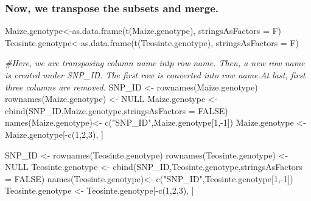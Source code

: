 \documentclass[
]{article}
\newenvironment{Shaded}{\begin{snugshade}}{\end{snugshade}}
\newcommand{\AttributeTok}[1]{\textcolor[rgb]{0.77,0.63,0.00}{#1}}
\newcommand{\CommentTok}[1]{\textcolor[rgb]{0.56,0.35,0.01}{\textit{#1}}}
\newcommand{\ConstantTok}[1]{\textcolor[rgb]{0.00,0.00,0.00}{#1}}
\newcommand{\DecValTok}[1]{\textcolor[rgb]{0.00,0.00,0.81}{#1}}
\newcommand{\FunctionTok}[1]{\textcolor[rgb]{0.00,0.00,0.00}{#1}}
\newcommand{\NormalTok}[1]{#1}
\newcommand{\OtherTok}[1]{\textcolor[rgb]{0.56,0.35,0.01}{#1}}
\newcommand{\SpecialCharTok}[1]{\textcolor[rgb]{0.00,0.00,0.00}{#1}}
\newcommand{\StringTok}[1]{\textcolor[rgb]{0.31,0.60,0.02}{#1}}
\begin{document}
\hypertarget{now-we-transpose-the-subsets-and-merge.}{%
\subsubsection{Now, we transpose the subsets and
merge.}\label{now-we-transpose-the-subsets-and-merge.}}

\begin{Shaded}
\begin{Highlighting}[]
\NormalTok{Maize.genotype}\OtherTok{\textless{}{-}}\FunctionTok{as.data.frame}\NormalTok{(}\FunctionTok{t}\NormalTok{(Maize.genotype), }\AttributeTok{stringsAsFactors =}\NormalTok{ F)}
\NormalTok{Teosinte.genotype}\OtherTok{\textless{}{-}}\FunctionTok{as.data.frame}\NormalTok{(}\FunctionTok{t}\NormalTok{(Teosinte.genotype), }\AttributeTok{stringsAsFactors =}\NormalTok{ F)}

\CommentTok{\#Here, we are transposing column name intp row name. Then, a new row name is created under SNP\_ID. The first row is converted into row name.At last, first three columns are removed.}
\NormalTok{SNP\_ID }\OtherTok{\textless{}{-}} \FunctionTok{rownames}\NormalTok{(Maize.genotype)}
\FunctionTok{rownames}\NormalTok{(Maize.genotype) }\OtherTok{\textless{}{-}} \ConstantTok{NULL}
\NormalTok{Maize.genotype }\OtherTok{\textless{}{-}} \FunctionTok{cbind}\NormalTok{(SNP\_ID,Maize.genotype,}\AttributeTok{stringsAsFactors =} \ConstantTok{FALSE}\NormalTok{)}
\FunctionTok{names}\NormalTok{(Maize.genotype)}\OtherTok{\textless{}{-}}  \FunctionTok{c}\NormalTok{(}\StringTok{"SNP\_ID"}\NormalTok{,Maize.genotype[}\DecValTok{1}\NormalTok{,}\SpecialCharTok{{-}}\DecValTok{1}\NormalTok{])}
\NormalTok{Maize.genotype }\OtherTok{\textless{}{-}}\NormalTok{ Maize.genotype[}\SpecialCharTok{{-}}\FunctionTok{c}\NormalTok{(}\DecValTok{1}\NormalTok{,}\DecValTok{2}\NormalTok{,}\DecValTok{3}\NormalTok{), ]}


\NormalTok{SNP\_ID }\OtherTok{\textless{}{-}} \FunctionTok{rownames}\NormalTok{(Teosinte.genotype)}
\FunctionTok{rownames}\NormalTok{(Teosinte.genotype) }\OtherTok{\textless{}{-}} \ConstantTok{NULL}
\NormalTok{Teosinte.genotype }\OtherTok{\textless{}{-}} \FunctionTok{cbind}\NormalTok{(SNP\_ID,Teosinte.genotype,}\AttributeTok{stringsAsFactors =} \ConstantTok{FALSE}\NormalTok{)}
\FunctionTok{names}\NormalTok{(Teosinte.genotype)}\OtherTok{\textless{}{-}}  \FunctionTok{c}\NormalTok{(}\StringTok{"SNP\_ID"}\NormalTok{,Teosinte.genotype[}\DecValTok{1}\NormalTok{,}\SpecialCharTok{{-}}\DecValTok{1}\NormalTok{])}
\NormalTok{Teosinte.genotype }\OtherTok{\textless{}{-}}\NormalTok{ Teosinte.genotype[}\SpecialCharTok{{-}}\FunctionTok{c}\NormalTok{(}\DecValTok{1}\NormalTok{,}\DecValTok{2}\NormalTok{,}\DecValTok{3}\NormalTok{), ]}
\end{Highlighting}
\end{Shaded}
\end{document}

